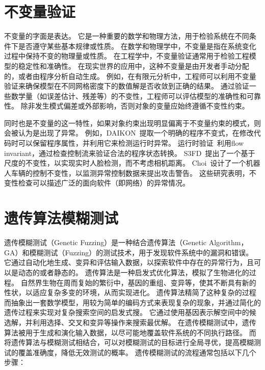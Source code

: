 \section{不变量验证}
不变量的字面是表达。
它是一种重要的数学和物理方法，用于检验系统在不同条件下是否遵守某些基本规律或性质。
在数学和物理学中，不变量是指在系统变化过程中保持不变的物理量或性质。
在工程学中，不变量验证通常用于检验工程模型的稳定性和准确性。
在现实世界的应用中，这种不变量是由开发者手动分配的，或者由程序分析自动生成。
例如，在有限元分析中，工程师可以利用不变量验证来确保模型在不同网格密度下的数值解是否收敛到正确的结果。
通过验证一些数学量（如误差估计、残差等）的不变性，工程师可以评估模型的准确性和可靠性。
除非发生模式偏差或外部影响，否则对象的变量应始终遵循不变性约束。

同时也是不变量的这一特性，如果对象约束出现明显偏离于不变量约束的模式，则会被认为是出现了异常。
例如，DAIKON~\cite{ernst2001dynamically}提取一个明确的程序不变式，在修改代码时可以保留程序属性，并利用它来检测运行时异常。
运行时验证~\cite{rocsu2009runtime}利用flow invariant，通过检查控制流来验证合法的程序状态转换。
S3FD~\cite{zhang2017s3fd}提出了一个基于尺度的不变性，以实现实时人脸检测，而不考虑相机距离。
Choi~\cite{choi2018detecting}设计了一个机器人车辆的控制不变性，以监测异常控制数据来提出攻击警告。
这些研究表明，不变性检查可以描述广泛的面向软件（即网络）的异常情况。


\section{遗传算法模糊测试}
遗传模糊测试（Genetic Fuzzing）是一种结合遗传算法（Genetic Algorithm，GA）和模糊测试（Fuzzing）的测试技术，用于发现软件系统中的漏洞和错误。
它通过自动化地生成、变异和评估输入数据，以探索软件中存在的异常行为，且可以是动态的或者静态的。
遗传算法是一种启发式优化算法，模拟了生物进化的过程。
自然界生物在周而复始的繁衍中，基因的重组、变异等，使其不断具有新的性状，以适应复杂多变的环境，从而实现进化。
遗传算法精简了这种复杂的过程而抽象出一套数学模型，用较为简单的编码方式来表现复杂的现象，并通过简化的遗传过程来实现对复杂搜索空间的启发式搜。
它通过使用基因表示解空间中的候选解，并利用选择、交叉和变异等操作来搜索最优解。
在遗传模糊测试中，遗传算法被用于生成和演化输入数据，以尽可能地覆盖软件系统的不同执行路径。
而将遗传算法与模糊测试相结合，可以对模糊测试的目标进行全局寻优，提高模糊测试的覆盖准确度，降低无效测试的概率。
遗传模糊测试的流程通常包括以下几个步骤：

